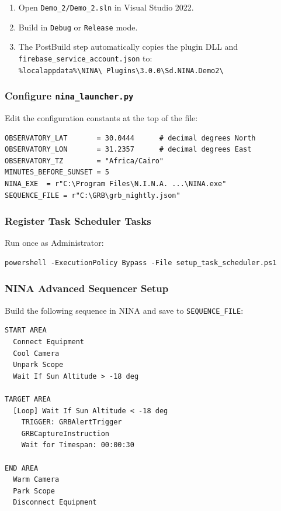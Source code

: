 \documentclass[12pt,a4paper]{article}
\begin{document}
\begin{enumerate}
    \item Open \texttt{Demo\_2/Demo\_2.sln} in Visual Studio 2022.
    \item Build in \texttt{Debug} or \texttt{Release} mode.
    \item The PostBuild step automatically copies the plugin DLL and
          \texttt{firebase\_service\_account.json} to:\\
          \texttt{\%localappdata\%\textbackslash NINA\textbackslash
          Plugins\textbackslash 3.0.0\textbackslash Sd.NINA.Demo2\textbackslash}
\end{enumerate}

\subsubsection{Configure \texttt{nina\_launcher.py}}

Edit the configuration constants at the top of the file:

\begin{lstlisting}[style=python]
OBSERVATORY_LAT       = 30.0444      # decimal degrees North
OBSERVATORY_LON       = 31.2357      # decimal degrees East
OBSERVATORY_TZ        = "Africa/Cairo"
MINUTES_BEFORE_SUNSET = 5
NINA_EXE  = r"C:\Program Files\N.I.N.A. ...\NINA.exe"
SEQUENCE_FILE = r"C:\GRB\grb_nightly.json"
\end{lstlisting}

\subsubsection{Register Task Scheduler Tasks}

Run once as Administrator:

\begin{lstlisting}[style=bash]
powershell -ExecutionPolicy Bypass -File setup_task_scheduler.ps1
\end{lstlisting}

\subsubsection{NINA Advanced Sequencer Setup}

Build the following sequence in NINA and save to \texttt{SEQUENCE\_FILE}:

\begin{verbatim}
START AREA
  Connect Equipment
  Cool Camera
  Unpark Scope
  Wait If Sun Altitude > -18 deg

TARGET AREA
  [Loop] Wait If Sun Altitude < -18 deg
    TRIGGER: GRBAlertTrigger
    GRBCaptureInstruction
    Wait for Timespan: 00:00:30

END AREA
  Warm Camera
  Park Scope
  Disconnect Equipment
\end{verbatim}
\end{document}
